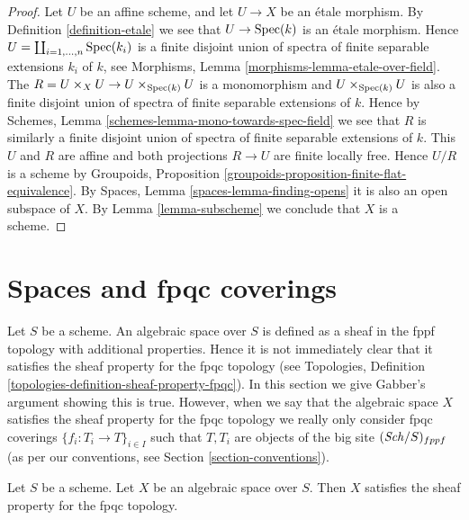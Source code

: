 \begin{proof}
Let $U$ be an affine scheme, and let $U \to X$ be an \'etale morphism. By
Definition \ref{definition-etale}
we see that $U \to \mathop{\mathrm{Spec}}(k)$ is an \'etale
morphism. Hence $U = \coprod_{i = 1, \ldots, n} \mathop{\mathrm{Spec}}(k_i)$
is a finite disjoint union of spectra of finite separable extensions
$k_i$ of $k$, see
Morphisms, Lemma \ref{morphisms-lemma-etale-over-field}.
The $R = U \times_X U \to U \times_{\mathop{\mathrm{Spec}}(k)} U$ is a monomorphism
and $U \times_{\mathop{\mathrm{Spec}}(k)} U$ is also a finite disjoint union of
spectra of finite separable extensions of $k$. Hence by
Schemes, Lemma \ref{schemes-lemma-mono-towards-spec-field}
we see that $R$ is similarly a finite disjoint union of
spectra of finite separable extensions of $k$.
This $U$ and $R$ are affine and
both projections $R \to U$ are finite locally free.
Hence $U/R$ is a scheme by
Groupoids, Proposition \ref{groupoids-proposition-finite-flat-equivalence}.
By
Spaces, Lemma \ref{spaces-lemma-finding-opens}
it is also an open subspace of $X$. By
Lemma \ref{lemma-subscheme}
we conclude that $X$ is a scheme.
\end{proof}













\section{Spaces and fpqc coverings}
\label{section-fpqc}

\noindent
Let $S$ be a scheme.
An algebraic space over $S$ is defined as a sheaf in the fppf topology with
additional properties. Hence it is not immediately clear that it satisfies
the sheaf property for the fpqc topology (see
Topologies, Definition \ref{topologies-definition-sheaf-property-fpqc}).
In this section we give Gabber's argument showing this is true.
However, when we say that the algebraic space $X$ satisfies the
sheaf property for the fpqc topology we really only consider fpqc
coverings $\{f_i : T_i \to T\}_{i \in I}$ such that $T, T_i$ are
objects of the big site $(\mathit{Sch}/S)_{fppf}$ (as per
our conventions, see Section \ref{section-conventions}).

\begin{proposition}[Gabber]
\label{proposition-sheaf-fpqc}
Let $S$ be a scheme. Let $X$ be an algebraic space over $S$. Then
$X$ satisfies the sheaf property for the fpqc topology.
\end{proposition}


